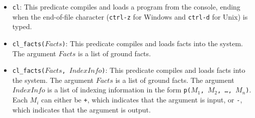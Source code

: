 \begin{itemize}
\item \texttt{cl}: This predicate compiles and loads a program from the console, ending when the end-of-file character ({\tt ctrl-z} for Windows and {\tt ctrl-d} for Unix) is typed.


\item \texttt{cl\_facts($Facts$)}: This predicate compiles and loads facts into the system.  The argument $Facts$ is a list of ground facts.

\item \texttt{cl\_facts($Facts$, $IndexInfo$)}: This predicate compiles and loads facts into the system.  The argument $Facts$ is a list of ground facts.  The argument $IndexInfo$ is a list of indexing information in the form \texttt{p($M_1$, $M_2$, \ldots, $M_n$)}.  Each $M_i$ can either be \texttt{+}, which indicates that the argument is input, or \texttt{-}, which indicates that the argument is output.
\end{itemize}

